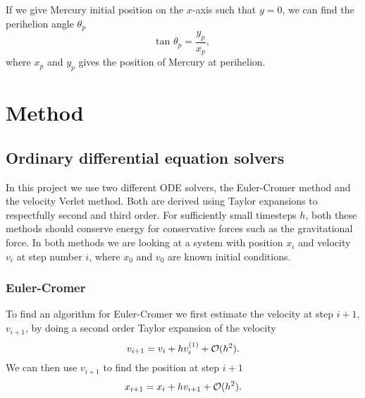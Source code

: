 \documentclass[norsk,a4paper,12pt]{article}
\begin{document}
{If we give Mercury initial position on the $x$-axis such that $y=0$, we can find the perihelion angle $\theta_p$
\begin{equation}
\text{tan }\theta_p = \frac{y_p}{x_p},
\label{eq:perihelionangle}
\end{equation}
where $x_p$ and $y_p$ gives the position of Mercury at perihelion.
\section{Method}
\subsection{Ordinary differential equation solvers}
In this project we use two different ODE solvers, the Euler-Cromer method and the velocity Verlet method. Both are derived using Taylor expansions to respectfully second and third order. For sufficiently small timesteps $h$, both these methods should conserve energy for conservative forces such as the gravitational force. In both methods we are looking at a system with position $x_i$ and velocity $v_i$ at step number $i$, where $x_0$ and $v_0$ are known initial conditions.
\subsubsection{Euler-Cromer}
To find an algorithm for Euler-Cromer we first estimate the velocity at step $i+1$, $v_{i+1}$, by doing a second order Taylor expansion of the velocity 
\begin{equation}
v_{i+1} = v_i + hv_i^{(1)} + {\cal O}(h^2). 
\label{eq:EulCrov}
\end{equation}
We can then use $v_{i+1}$ to find the position at step $i+1$
\begin{equation}
x_{i+1} = x_i + hv_{i+1} + {\cal O}(h^2).
\label{eq:EulCrox}
\end{equation}
}
\end{document}
